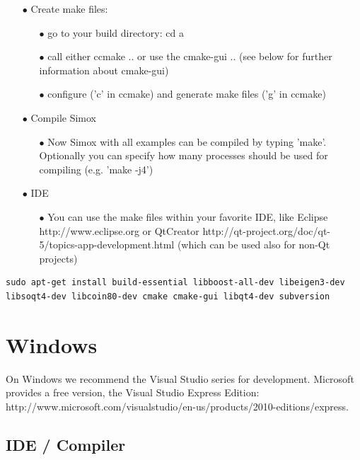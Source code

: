 \documentclass{book}
\begin{document}
\begin{itemize}
\begin{itemize}
\item[$\bullet$] Create make files: 
\begin{itemize}
\item[$\bullet$] go to your build directory: cd a
\item[$\bullet$] call either ccmake .. or use the cmake-gui .. (see below for further information about cmake-gui) 
\item[$\bullet$] configure ('c' in ccmake) and generate make files ('g' in ccmake) 
\end{itemize}
\item[$\bullet$] Compile Simox 
\begin{itemize}
\item[$\bullet$] Now Simox with all examples can be compiled by typing 'make'. Optionally you can specify how many processes should be used for compiling (e.g. 'make -j4') 
\end{itemize}
\item[$\bullet$] IDE 
\begin{itemize}
\item[$\bullet$] You can use the make files within your favorite IDE, like Eclipse http://www.eclipse.org or QtCreator http://qt-project.org/doc/qt-5/topics-app-development.html (which can be used also for non-Qt projects) 
\end{itemize}
\end{itemize}
\end{itemize}
\begin{lstlisting}
sudo apt-get install build-essential libboost-all-dev libeigen3-dev libsoqt4-dev libcoin80-dev cmake cmake-gui libqt4-dev subversion
\end{lstlisting}
\section{Windows}
On Windows we recommend the Visual Studio series for development. Microsoft provides a free version, the Visual Studio Express Edition: \\http://www.microsoft.com/visualstudio/en-us/products/2010-editions/express. 
\subsection{IDE / Compiler}
\end{document}
